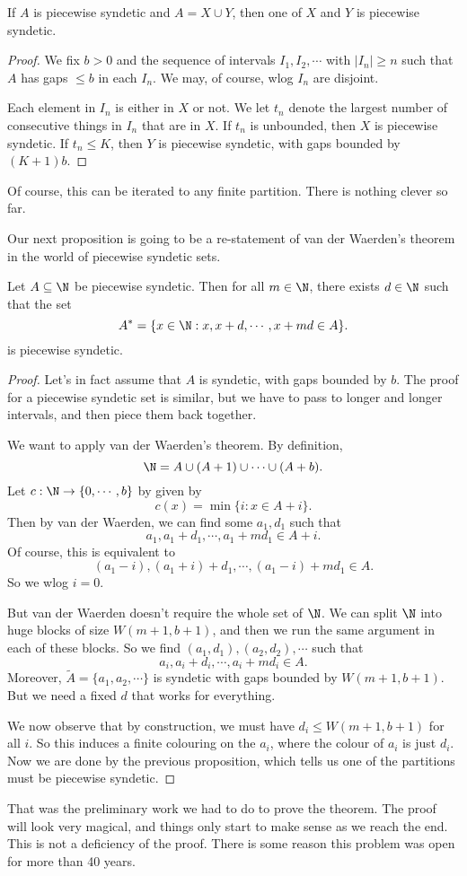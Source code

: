 \documentclass[a4paper]{article}
\begin{document}
\begin{prop}
  If $A$ is piecewise syndetic and $A = X \cup Y$, then one of $X$ and $Y$ is piecewise syndetic.
\end{prop}

\begin{proof}
  We fix $b > 0$ and the sequence of intervals $I_1, I_2, \cdots$ with $|I_n| \geq n$ such that $A$ has gaps $\leq b$ in each $I_n$. We may, of course, wlog $I_n$ are disjoint.

  Each element in $I_n$ is either in $X$ or not. We let $t_n$ denote the largest number of consecutive things in $I_n$ that are in $X$. If $t_n$ is unbounded, then $X$ is piecewise syndetic. If $t_n \leq K$, then $Y$ is piecewise syndetic, with gaps bounded by $(K + 1)b$.
\end{proof}
Of course, this can be iterated to any finite partition. There is nothing clever so far.

Our next proposition is going to be a re-statement of van der Waerden's theorem in the world of piecewise syndetic sets.
\begin{prop}
  Let $A \subseteq \N$ be piecewise syndetic. Then for all $m \in \N$, there exists $d \in \N$ such that the set
  \[
    A^* = \{ x\in \N: x , x + d, \cdots, x + md \in A\}.
  \]
  is piecewise syndetic.
\end{prop}

\begin{proof}
  Let's in fact assume that $A$ is syndetic, with gaps bounded by $b$. The proof for a piecewise syndetic set is similar, but we have to pass to longer and longer intervals, and then piece them back together. %

  We want to apply van der Waerden's theorem. By definition,
  \[
    \N = A \cup (A + 1) \cup \cdots \cup (A + b).
  \]
  Let $c: \N \to \{0, \cdots, b\}$ by given by
  \[
    c(x) = \min \{i: x \in A + i\}.
  \]
  Then by van der Waerden, we can find some $a_1, d_1$ such that
  \[
    a_1, a_1 + d_1, \cdots, a_1 + m d_1 \in A + i.
  \]
  Of course, this is equivalent to
  \[
    (a_1 - i), (a_1 + i) + d_1, \cdots, (a_1 - i) + m d_1 \in A.
  \]
  So we wlog $i = 0$.

  But van der Waerden doesn't require the whole set of $\N$. We can split $\N$ into huge blocks of size $W(m + 1, b + 1)$, and then we run the same argument in each of these blocks. So we find $(a_1, d_1), (a_2, d_2), \cdots$ such that
  \[
    a_i, a_i + d_i, \cdots, a_i + m d_i \in A.
  \]
  Moreover, $\tilde{A}= \{a_1, a_2, \cdots\}$ is syndetic with gaps bounded by $W(m + 1, b + 1)$. But we need a fixed $d$ that works for everything.

  We now observe that by construction, we must have $d_i \leq W(m + 1, b + 1)$ for all $i$. So this induces a finite colouring on the $a_i$, where the colour of $a_i$ is just $d_i$. Now we are done by the previous proposition, which tells us one of the partitions must be piecewise syndetic.
\end{proof}
That was the preliminary work we had to do to prove the theorem. The proof will look very magical, and things only start to make sense as we reach the end. This is not a deficiency of the proof. There is some reason this problem was open for more than 40 years.
\end{document}
